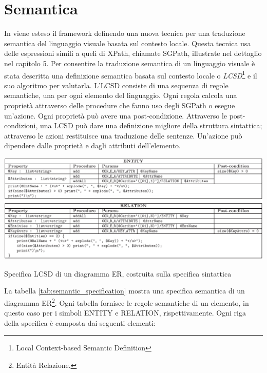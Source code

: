     \section{Semantica}
        \label{sec:semantica}
        In \cite{localcontext} viene esteso il framework definendo una nuova tecnica per una traduzione semantica del linguaggio visuale basata sul contesto locale. Questa tecnica usa delle espressioni simili a queli di XPath, chiamate SGPath, illustrate nel dettaglio nel capitolo 5.
        \newline
        Per consentire la traduzione semantica di un linguaggio visuale è stata descritta una definizione semantica basata sul contesto locale o \textit{LCSD}\footnote{Local Context-based Semantic Definition} e il suo algoritmo per valutarla. L'LCSD consiste di una sequenza di regole semantiche, una per ogni elemento del linguaggio. Ogni regola calcola una proprietà attraverso delle procedure che fanno uso degli SGPath o esegue un'azione. Ogni proprietà può avere una post-condizione.
        \newline
        Attraverso le post-condizioni, una LCSD può dare una definizione migliore della struttura sintattica; attraverso le azioni restituisce una traduzione delle sentenze. Un'azione può dipendere dalle proprietà e dagli attributi dell'elemento.
        \begin{table}[htbp]
            \centering
            \includegraphics[scale=0.37]{Figure/semantic_specification.PNG}
            \caption{Specifica LCSD di un diagramma ER, costruita sulla specifica sintattica \cite{localcontext}}
            \label{tab:semantic_specification}
        \end{table}
        \newline
        La tabella \ref{tab:semantic_specification} mostra una specifica semantica di un diagramma ER\footnote{Entità Relazione.}. Ogni tabella fornisce le regole semantiche di un elemento, in questo caso per i simboli ENTITY e RELATION, rispettivamente. Ogni riga della specifica è composta dai seguenti elementi:
